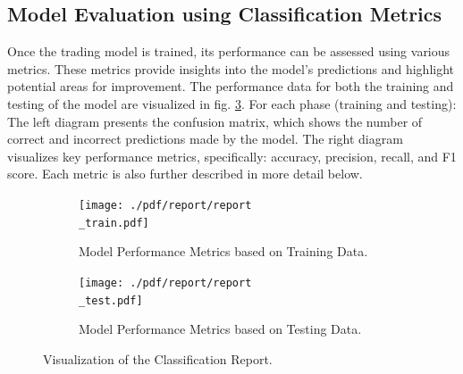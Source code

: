 \subsection{Model Evaluation using Classification Metrics}
Once the trading model is trained, its performance can be assessed using various metrics.
These metrics provide insights into the model's predictions and highlight potential areas for improvement.
The performance data for both the training and testing of the model are visualized in fig. \ref{fig:conf_matrix}.
For each phase (training and testing): The left diagram presents the confusion matrix, which shows the number of correct and incorrect predictions made by the model.
The right diagram visualizes key performance metrics, specifically: accuracy, precision, recall, and F1 score.
Each metric is also further described in more detail below.
\begin{figure}[h]
    \centering

    \begin{subfigure}[b]{\textwidth}
        \begin{adjustbox}{max width=0.8\textwidth,center}
            \texttt{[image: ./pdf/report/report\\\_train.pdf]}
        \end{adjustbox}
        \caption{Model Performance Metrics based on Training Data.}
        \label{fig:train_perf}
    \end{subfigure}

    \bigskip %

    \begin{subfigure}[b]{\textwidth}
        \begin{adjustbox}{max width=0.8\textwidth,center}
            \texttt{[image: ./pdf/report/report\\\_test.pdf]}
        \end{adjustbox}
        \caption{Model Performance Metrics based on Testing Data.}
        \label{fig:test_perf}
    \end{subfigure}

    \caption{Visualization of the Classification Report.}
    \label{fig:conf_matrix}
\end{figure}

